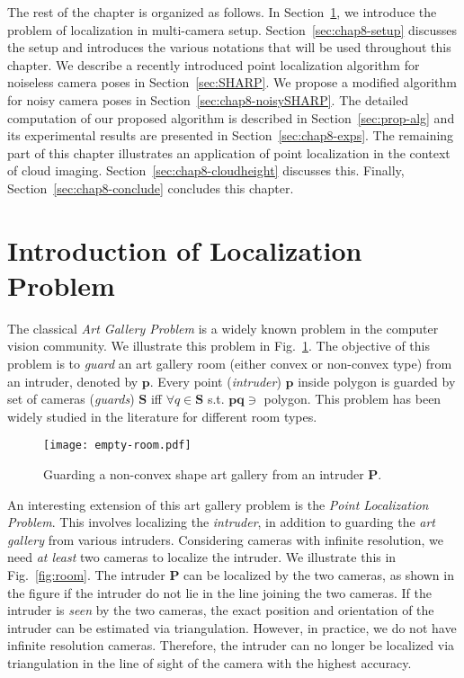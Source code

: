 The rest of the chapter is organized as follows. In Section~\ref{sec:chap8-locproblem}, we introduce the problem of localization in multi-camera setup. Section~\ref{sec:chap8-setup} discusses the setup and introduces the various notations that will be used throughout this chapter. We describe a recently introduced point localization algorithm for noiseless camera poses in Section~\ref{sec:SHARP}. We propose a modified algorithm for noisy camera poses in Section~\ref{sec:chap8-noisySHARP}. The detailed computation of our proposed algorithm is described in Section~\ref{sec:prop-alg} and its experimental results are presented in Section~\ref{sec:chap8-exps}. The remaining part of this chapter illustrates an application of point localization in the context of cloud imaging. Section~\ref{sec:chap8-cloudheight} discusses this. Finally, Section~\ref{sec:chap8-conclude} concludes this chapter.



\section{Introduction of Localization Problem}
\label{sec:chap8-locproblem}
The classical \emph{Art Gallery Problem} is a widely known problem in the computer vision community. We illustrate this problem in Fig.~\ref{fig:empty-room}. The objective of this problem is to \emph{guard} an art gallery room (either convex or non-convex type) from an intruder, denoted by $\mathbf{p}$. Every point (\emph{intruder}) $\mathbf{p}$ inside polygon is guarded by set of cameras (\emph{guards}) $\mathbf{S}$ iff $\forall q \in \mathbf{S}$ s.t. $\mathbf{pq} \ni$ polygon. This problem has been widely studied in the literature for different room types.

\begin{figure}[htb]
\centering
\hspace{-1.5cm}
{\texttt{[image: empty-room.pdf]}}
\vspace{-1.5cm}
\caption{Guarding a non-convex shape art gallery from an intruder $\mathbf{P}$.}
\label{fig:empty-room}
\end{figure}

An interesting extension of this art gallery problem is the \emph{Point Localization Problem}. This involves localizing the \emph{intruder}, in addition to guarding the \emph{art gallery} from various intruders. Considering cameras with infinite resolution, we need \emph{at least} two cameras to localize the intruder. We illustrate this in Fig.~\ref{fig:room}. The intruder $\mathbf{P}$ can be localized by the two cameras, as shown in the figure if the intruder do not lie in the line joining the two cameras. If the intruder is \emph{seen} by the two cameras, the exact position and orientation of the intruder can be estimated via triangulation. However, in practice, we do not have infinite resolution cameras. Therefore, the intruder can no longer be localized via triangulation in the line of sight of the camera with the highest accuracy. 

